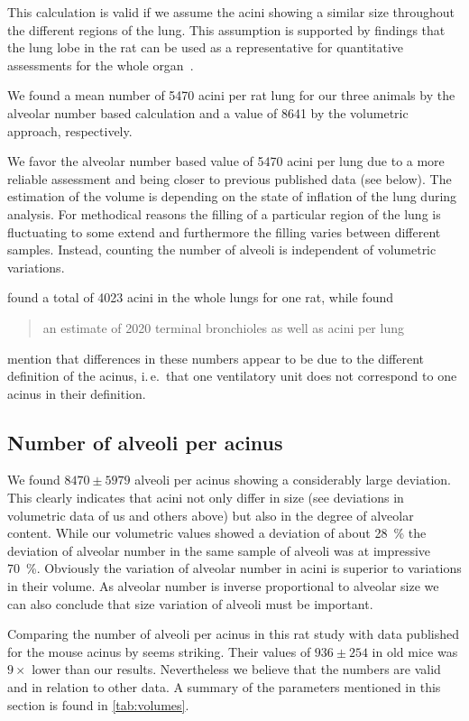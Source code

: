 \documentclass[paper=a4,DIV=calc,abstract,english]{scrartcl}
\newcommand{\ie}{i.\,e.\ }
\newcommand{\meantotalnumberofacini}{8641\xspace}
\newcommand{\meantotalnumberofaciniVariant}{5470\xspace}
\newcommand{\meannumberofalveoli}{8470\xspace} %
\newcommand{\meannumberofalveoliSTD}{5979\xspace}
\begin{document}
This calculation is valid if we assume the acini showing a similar size throughout the different regions of the lung.
This assumption is supported by findings that the lung lobe in the rat can be used as a representative for quantitative assessments for the whole organ~\citep{Zeltner1990}.

We found a mean number of \meantotalnumberofaciniVariant acini per rat lung for our three animals by the alveolar number based calculation and a value of \meantotalnumberofacini by the volumetric approach, respectively.


We favor the alveolar number based value of \meantotalnumberofaciniVariant acini per lung due to a more reliable assessment and being closer to previous published data (see below).
The estimation of the volume is depending on the state of inflation of the lung during analysis.
For methodical reasons the filling of a particular region of the lung is fluctuating to some extend and furthermore the filling varies between different samples.
Instead, counting the number of alveoli is independent of volumetric variations.

\citet{Rodriguez1987} found a total of 4023 acini in the whole lungs for one rat, while \citet{Mercer1987a} found \blockquote{an estimate of 2020 terminal bronchioles as well as acini per lung}.
\citeauthor{Mercer1987a} mention that differences in these numbers appear to be due to the different definition of the acinus, \ie that one ventilatory unit does not correspond to one acinus in their definition.

\subsection{Number of alveoli per acinus}
We found \(\meannumberofalveoli\pm\meannumberofalveoliSTD\) alveoli per acinus showing a considerably large deviation.
This clearly indicates that acini not only differ in size (see deviations in volumetric data of us and others above) but also in the degree of alveolar content.
While our volumetric values showed a deviation of about \SI{28}{\percent} the deviation of alveolar number in the same sample of alveoli was at impressive \SI{70}{\percent}.
Obviously the variation of alveolar number in acini is superior to variations in their volume.
As alveolar number is inverse proportional to alveolar size we can also conclude that size variation of alveoli must be important.

Comparing the number of alveoli per acinus in this rat study with data published for the mouse acinus by \citet{Vasilescu2012} seems striking.
Their values of \(936\pm254\) in old mice was \(9\times\) lower than our results.
Nevertheless we believe that the numbers are valid and in relation to other data.
A summary of the parameters mentioned in this section is found in \autoref{tab:volumes}.
\end{document}
